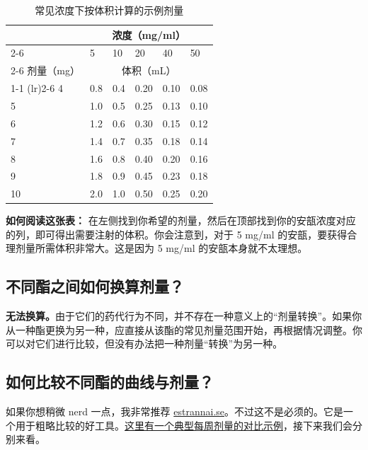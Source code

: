 \documentclass{article}
\begin{document}
\begin{table}
\centering
\caption{常见浓度下按体积计算的示例剂量}
\label{tab:concentrations}
\begin{tabular}{@{}llllll@{}}
  \toprule
  \multicolumn{1}{c}{} & \multicolumn{5}{c}{浓度（mg/ml）} \\
  \cmidrule(rl){2-6}
            & 5    & 10  & 20 & 40 & 50   \\
            \cmidrule(rl){2-6}
剂量（mg） & \multicolumn{5}{c}{体积（mL）}  \\
    \cmidrule(r){1-1} \cmidrule(lr){2-6}
4        & 0.8  & 0.4 & 0.20  & 0.10 & 0.08\\
5        & 1.0    & 0.5 & 0.25 & 0.13 &  0.10\\
6        & 1.2  & 0.6   & 0.30  & 0.15 & 0.12   \\
7        & 1.4  & 0.7 & 0.35  & 0.18 & 0.14\\
8        & 1.6  & 0.8   & 0.40  & 0.20 & 0.16  \\
9        & 1.8  & 0.9 & 0.45  & 0.23 & 0.18\\
10       & 2.0    & 1.0   & 0.50  & 0.25 & 0.20 \\
  \bottomrule
\end{tabular}
\end{table}

\textbf{如何阅读这张表：} 在左侧找到你希望的剂量，然后在顶部找到你的安瓿浓度对应的列，即可得出需要注射的体积。你会注意到，对于 5 mg/ml 的安瓿，要获得合理剂量所需体积非常大。这是因为 5 mg/ml 的安瓿本身就不太理想。

\subsection{不同酯之间如何换算剂量？}

\textbf{无法换算。}由于它们的药代行为不同，并不存在一种意义上的“剂量转换”。如果你从一种酯更换为另一种，应直接从该酯的常见剂量范围开始，再根据情况调整。你可以对它们进行比较，但没有办法把一种剂量“转换”为另一种。

\subsection{如何比较不同酯的曲线与剂量？}

如果你想稍微 nerd 一点，我非常推荐 \href{http://estrannai.se}{estrannai.se}。不过这不是必须的。它是一个用于粗略比较的好工具。\href{https://estrannai.se/\#i0__cu,7,7,1-cu,5,7,3-cu,5,7,2}{这里有一个典型每周剂量的对比示例}，接下来我们会分别来看。
\end{document}
